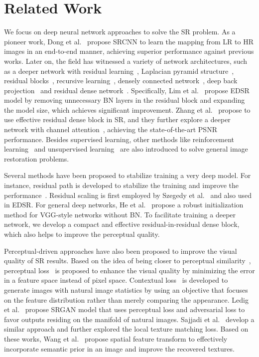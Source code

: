 \documentclass[runningheads]{llncs}
\begin{document}
\section{Related Work}
We focus on deep neural network approaches to solve the SR problem.
%
As a pioneer work, Dong et al.~\cite{dong2014learning,dong2016image} propose SRCNN to learn the mapping from LR to HR 
images in an end-to-end manner, achieving superior performance against previous works.
%
Later on, the field has witnessed a variety of network architectures, such as a deeper network with residual
learning~\cite{kim2016accurate}, Laplacian pyramid structure~\cite{lai2017deep}, residual blocks~\cite{ledig2017photo},
recursive learning~\cite{kim2016deeply,tai2017image}, densely connected network~\cite{tai2017memnet}, deep back
projection~\cite{haris2018deep} and residual dense network~\cite{zhang2018residual}.
%
Specifically, Lim et al.~\cite{lim2017enhanced} propose EDSR model by removing unnecessary BN layers in the residual 
block and expanding the model size, which achieves significant improvement.
%
Zhang et al.~\cite{zhang2018residual} propose to use effective residual dense block in SR, and they further explore a 
deeper network with channel attention~\cite{zhang2018image}, achieving the state-of-the-art PSNR performance.
% 
Besides supervised learning, other methods like reinforcement learning~\cite{yu2018crafting} and unsupervised 
learning~\cite{yuan2018unsupervised} are also introduced to solve general image restoration problems.

Several methods have been proposed to stabilize training a very deep model. 
For instance, residual path is developed to stabilize the training and improve the 
performance~\cite{he2016deep,kim2016accurate,zhang2018image}.
%
Residual scaling is first employed by Szegedy et al.~\cite{szegedy2016inception} and also used in EDSR.
%
For general deep networks, He et al.~\cite{he2015delving} propose a robust initialization method for VGG-style 
networks without BN.
%
To facilitate training a deeper network, we develop a compact and effective residual-in-residual dense block, 
which also helps to improve the perceptual quality.

Perceptual-driven approaches have also been proposed to improve the visual quality of SR results. 
%
Based on the idea of being closer to perceptual similarity~\cite{gatys2015texture,bruna2015super}, perceptual 
loss~\cite{johnson2016perceptual} is proposed to enhance the visual quality by minimizing the error in a feature space 
instead of pixel space.
%
Contextual loss~\cite{roey2018maintaining} is developed to generate images with natural image statistics by using an  
objective that focuses on the feature distribution rather than merely comparing the appearance.
%
Ledig et al.~\cite{ledig2017photo} propose SRGAN model that uses perceptual loss and adversarial loss to favor 
outputs residing on the manifold of natural images. 
%
Sajjadi et al.~\cite{sajjadi2017enhancenet} develop a similar approach and further explored the local texture matching 
loss.
%
Based on these works, Wang et al.~\cite{wang2018sftgan} propose spatial feature transform to effectively incorporate  
semantic prior in an image and improve the recovered textures. 
\end{document}
